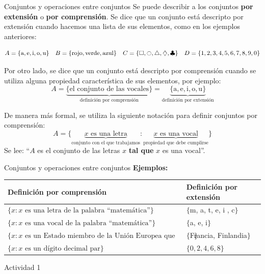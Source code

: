 \documentclass[9pt, aspectratio=169]{beamer}
\begin{document}
\begin{frame}{Conjuntos y operaciones entre conjuntos}
    Se puede describir a los conjuntos \textbf{por extensión} o \textbf{por comprensión}. Se dice que un conjunto está descripto por extensión cuando hacemos una lista de sus elementos, como en los ejemplos anteriores:

\[ A = \{ \text{a}, \text{e}, \text{i}, \text{o}, \text{u} \} \quad B = \{ \text{rojo}, \text{verde}, \text{azul} \} \quad C = \{ \square, \ocircle, \triangle, \diamondsuit, \clubsuit\} \quad  D  = \{1, 2, 3, 4, 5, 6,7 ,8, 9, 0 \}  \] 

Por otro lado, se dice que un conjunto está descripto por comprensión cuando se utiliza alguna propiedad característica de sus elementos, por ejemplo:
\[ A = \underbrace{\{ \text{el conjunto de las vocales} \}}_{\text{definición por comprensión}} = \underbrace{ \{ \text{a}, \text{e}, \text{i}, \text{o}, \text{u} \} }_{\text{definición por extensión}} \]

De manera más formal, se utiliza la siguiente notación para definir conjuntos por comprensión:
\[ A = \{ \underbrace{x \text{ es una letra}}_{\text{conjunto con el que trabajamos}} : \underbrace{x \text{ es una vocal}}_{\text{propiedad que debe cumplirse}} \} \]
Se lee: ``$A$ es el conjunto de las letras $x$ \textbf{tal que} $x$ es una vocal''. 
\end{frame}

\begin{frame}{Conjuntos y operaciones entre conjuntos}
\textbf{Ejemplos:}
    \begin{center}
        \begin{tabular}{p{9.5cm} p{4cm}}
            \toprule
            \textbf{Definición por comprensión} & \textbf{Definición por extensión} \\
            \midrule
            $\{ x : x \text{ es una letra de la palabra ``matemática''} \}$ & $\{$m, a, t, e, i , c$\}$ \\
            $\{ x : x \text{ es una vocal de la palabra ``matemática''}\}$ & $\{$a, e, i$\}$ \\
            $\{ x : x \text{ es un Estado miembro de la Unión Europea que empieza con ``F''}\}$ & $\{$Francia, Finlandia$\}$ \\
            $\{ x : x \text{ es un dígito decimal par}\}$ & $\{0, 2, 4, 6, 8\}$ \\
            \bottomrule
        \end{tabular}
    \end{center}

\vspace{3em}
\begin{center}
{\Large \faArrowCircleRight \faPen* Actividad 1}
\end{center}
\end{frame}
\end{document}
